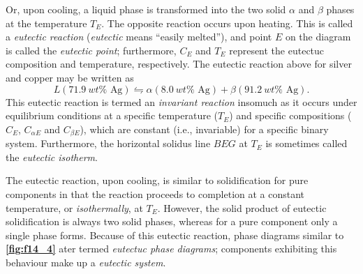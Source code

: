 Or, upon cooling, a liquid phase is transformed into the two solid $\alpha$ and $\beta$ phases at the temperature $T_E$. The opposite reaction occurs upon heating. This is called a \textit{eutectic reaction} (\textit{eutectic} means ``easily melted''), and point $E$ on the diagram is called the \textit{eutectic point}; furthermore, $C_E$ and $T_E$ represent the eutectuc composition and temperature, respectively. The eutectic reaction above for silver and copper may be written as
\[ 
L(\qty{71,9}{wt}\% \text{ Ag}) \leftrightharpoons \alpha(\qty{8,0}{wt}\% \text{ Ag}) + \beta(\qty{91,2}{wt}\% \text{ Ag})
.\]
This eutectic reaction is termed an \textit{invariant reaction} insomuch as it occurs under equilibrium conditions at a specific temperature ($T_E$) and specific compositions ($C_E$, $C_{\alpha E}$ and $C_{\beta E}$), which are constant (i.e., invariable) for a specific binary system. Furthermore, the horizontal solidus line $BEG$ at $T_E$ is sometimes called the \textit{eutectic isotherm}.

The eutectic reaction, upon cooling, is similar to solidification for pure components in that the reaction proceeds to completion at a constant temperature, or \textit{isothermally}, at $T_E$. However, the solid product of eutectic solidification is always two solid phases, whereas for a pure component only a single phase forms. Because of this eutectic reaction, phase diagrams similar to \textbf{\autoref{fig:f14_4}} ater termed \textit{eutectuc phase diagrams}; components exhibiting this behaviour make up a \textit{eutectic system}. 
